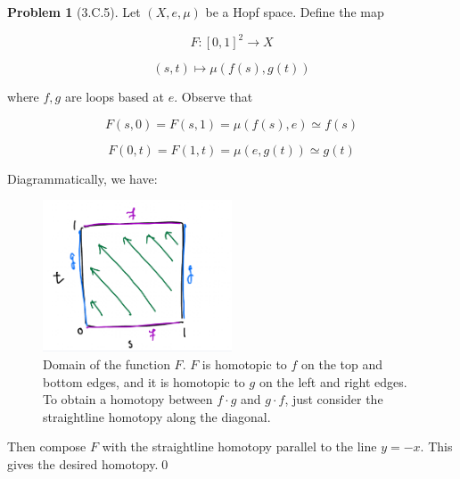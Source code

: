 \documentclass[10pt]{article}
\theoremstyle{definition}
\newtheorem*{problem}{Problem}
\begin{document}
\begin{problem}[3.C.5]
Let $(X,e,\mu)$ be a Hopf space. Define the map 

\begin{equation}
	F: [0,1]^2 \to X
\end{equation}

\begin{equation}
	(s,t) \mapsto \mu(f(s),g(t))
\end{equation}

where $f,g$ are loops based at $e$. Observe that 

\begin{equation}
	F(s,0) = F(s,1) = \mu(f(s),e) \simeq f(s)
\end{equation}

\begin{equation}
	F(0,t) = F(1,t) = \mu(e,g(t)) \simeq g(t)
\end{equation}

Diagrammatically, we have: 

\begin{figure}[h]
\caption{Domain of the function $F$. $F$ is homotopic to $f$ on the top and bottom edges, and it is homotopic to $g$ on the left and right edges. To obtain a homotopy between $f\cdot g$ and $g\cdot f$, just consider the straightline homotopy along the diagonal.}
\centering
\includegraphics[width=0.5\textwidth]{image/3c5_hom_on_square.png}
\end{figure}


Then compose $F$ with the straightline homotopy parallel to the line $y = -x$. This gives the desired homotopy.\qed
\end{problem}
\end{document}
